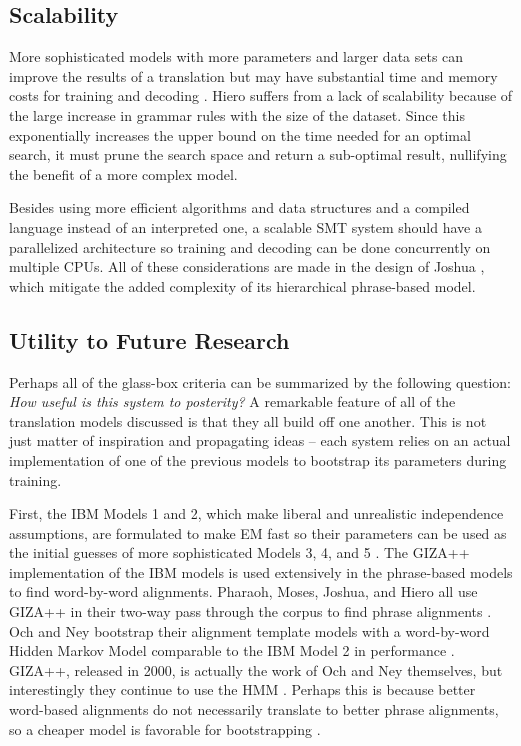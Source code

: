 \documentclass[11pt]{article}
\begin{document}
\subsection{Scalability}
More sophisticated models with more parameters and larger data sets can improve the results of a translation
but may have substantial time and memory costs for training and decoding \cite{chiang:07}.
Hiero suffers from a lack of scalability because of the large increase in grammar rules with the size of the
dataset. Since this exponentially increases the upper bound on the time needed for an optimal search,
it must prune the search space and return a sub-optimal result, nullifying the benefit of a more complex model.

Besides using more efficient algorithms and data structures and a compiled language instead of an interpreted one,
a scalable SMT system should have a parallelized architecture
so training and decoding can be done concurrently on multiple CPUs. 
All of these considerations are made in the design of Joshua \cite{joshua}, which mitigate the added complexity
of its hierarchical phrase-based model.

\subsection{Utility to Future Research} \label{future}
Perhaps all of the glass-box criteria can be summarized by the following question: \textit{How useful is this system to posterity?}
A remarkable feature of all of the translation models discussed is that they all build off one another.
This is not just matter of inspiration and propagating ideas -- each system relies on an actual implementation
of one of the previous models to bootstrap its parameters during training. 

First, the IBM Models 1 and 2, which
make liberal and unrealistic independence assumptions, are formulated to make EM fast so their parameters
can be used as the initial guesses of more sophisticated Models 3, 4, and 5 \cite{brown:93}. 
The GIZA++ implementation of the IBM models \cite{giza} is used extensively in the phrase-based models to find word-by-word alignments.
Pharaoh, Moses, Joshua, and Hiero all use GIZA++ in their two-way pass through the corpus to find phrase alignments \cite{koehn:03, pharaoh, moses, joshua, chiang:05}.
Och and Ney bootstrap their alignment template models with a word-by-word Hidden Markov Model comparable to the IBM Model 2 in performance \cite{och:99}.
GIZA++, released in 2000, is actually the work of Och and Ney themselves, but interestingly they continue to use the HMM \cite{och:00, giza, och:04}.
Perhaps this is because better word-based alignments do not necessarily translate to better phrase alignments,
so a cheaper model is favorable for bootstrapping \cite{koehn:03}. 
\end{document}
